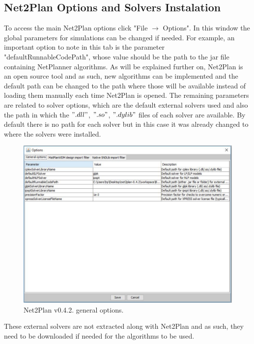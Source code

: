     \newpage
	\subsection*{Net2Plan Options and Solvers Instalation}
	\vspace{0.5cm}
	To access the main Net2Plan options click "File $\rightarrow$ Options". In this window the global parameters for simulations can be changed if needed.
	For example, an important option to note in this tab is the parameter "defaultRunnableCodePath", whose value should be the path to the jar file containing NetPlanner algorithms. As will be explained further on, Net2Plan is an open source tool and as such, new algorithms can be implemented and the default path can be changed to the path where those will be available instead of loading them manually each time Net2Plan is opened.	The remaining parameters are related to solver options, which are the default external solvers used and also the path in which the $".dll"$, $".so"$, $".dylib"$ files of each solver are available. By default there is no path for each solver but in this case it was already changed to where the solvers were installed.
	
	\begin{figure} [h!]
		\centering
		\includegraphics[width = 13cm]{Net2Plan_options.pdf}
		\caption{Net2Plan v0.4.2. general options.}
	\end{figure}
		
	These external solvers are not extracted along with Net2Plan and as such, they need to be downloaded if needed for the algorithms to be used.


